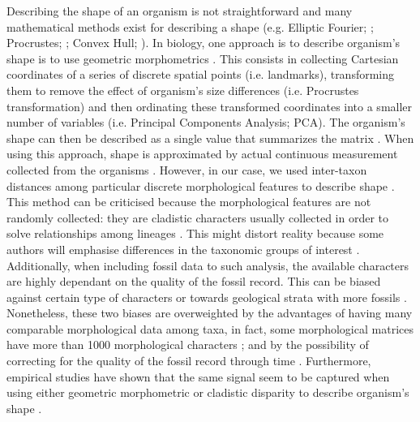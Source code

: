 Describing the shape of an organism is not straightforward and many mathematical methods exist for describing a shape (e.g. Elliptic Fourier; \citealt{Fourier1982}; Procrustes; \citealt{JamesRohlf1993129}; Convex Hull; \citealt{ANDREW1979216}).
In biology, one approach is to describe organism's shape is to use geometric morphometrics \citep{zelditch2012geometric}.
This consists in collecting Cartesian coordinates of a series of discrete spatial points (i.e. landmarks), transforming them to remove the effect of organism's size differences (i.e. Procrustes transformation) and then ordinating these transformed coordinates into a smaller number of variables (i.e. Principal Components Analysis; PCA).
The organism's shape can then be described as a single value that summarizes the matrix \citep[e.g. the sum of the ranges of each PCA axis][]{zelditch2012geometric}.
When using this approach, shape is approximated by actual continuous measurement collected from the organisms \citep[e.g.][]{friedmanexplosive2010,hopkinsdecoupling2013,finlay2015morphological}.
However, in our case, we used inter-taxon distances among particular discrete morphological features to describe shape \citep[i.e. the cladistic disparity method; e.g.][]{foote1997evolution,Wills2001,Wesley-Hunt2005}.
This method can be criticised because the morphological features are not randomly collected: they are cladistic characters usually collected in order to solve relationships among lineages \citep{O'Leary08022013}.
This might distort reality because some authors will emphasise differences in the taxonomic groups of interest \citep{Hopkins24032015}.
Additionally, when including fossil data to such analysis, the available characters are highly dependant on the quality of the fossil record.
This can be biased against certain type of characters \citep[e.g. soft tissue ones;][]{sansomfossilization2013} or towards geological strata with more fossils \citep[e.g. \textit{Lagerst\"{a}tten};][]{Butler2012}.
Nonetheless, these two biases are overweighted by the advantages of having many comparable morphological data among taxa, in fact, some morphological matrices have more than 1000 morphological characters \citep[e.g.][]{O'Leary08022013,ni2013oldest}; and by the possibility of correcting for the quality of the fossil record through time \citep{Butler2012}.
Furthermore, empirical studies have shown that the same signal seem to be captured when using either geometric morphometric or cladistic disparity to describe organism's shape \citep{foth2012different,hetherington2015cladistic}. 

